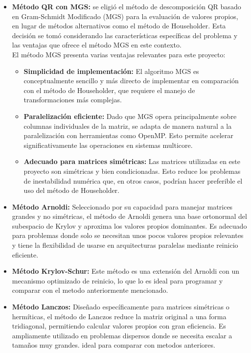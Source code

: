 \documentclass{article}
\begin{document}
\begin{itemize}
    \item \textbf{Método QR con MGS:}  
     se eligió el método de descomposición QR basado en Gram-Schmidt Modificado (MGS) para la evaluación de valores propios, en lugar de métodos alternativos como el método de Householder. Esta decisión se tomó considerando las características específicas del problema y las ventajas que ofrece el método MGS en este contexto.
\\
    
    El método MGS presenta varias ventajas relevantes para este proyecto:
    \begin{itemize}
        \item \textbf{Simplicidad de implementación:} El algoritmo MGS es conceptualmente sencillo y más directo de implementar en comparación con el método de Householder, que requiere el manejo de transformaciones más complejas.
        \item \textbf{Paralelización eficiente:} Dado que MGS opera principalmente sobre columnas individuales de la matriz, se adapta de manera natural a la paralelización con herramientas como OpenMP. Esto permite acelerar significativamente las operaciones en sistemas multicore.
        \item \textbf{Adecuado para matrices simétricas:} Las matrices utilizadas en este proyecto son simétricas y bien condicionadas. Esto reduce los problemas de inestabilidad numérica que, en otros casos, podrían hacer preferible el uso del método de Householder.
    \end{itemize}

    \item \textbf{Método Arnoldi:}  
    Seleccionado por su capacidad para manejar matrices grandes y no simétricas, el método de Arnoldi genera una base ortonormal del subespacio de Krylov y aproxima los valores propios dominantes. Es adecuado para problemas donde solo se necesitan unos pocos valores propios relevantes y tiene la flexibilidad de usarse en arquitecturas paralelas mediante reinicio eficiente.

    \item \textbf{Método Krylov-Schur:}  
    Este método es una extensión del Arnoldi con un mecanismo optimizado de reinicio, lo que lo es ideal para programar y comparar con el metodo anteriormente mencionado.

    \item \textbf{Método Lanczos:}  
    Diseñado específicamente para matrices simétricas o hermíticas, el método de Lanczos reduce la matriz original a una forma tridiagonal, permitiendo calcular valores propios con gran eficiencia. Es ampliamente utilizado en problemas dispersos donde se necesita escalar a tamaños muy grandes. ideal para comparar con metodos anteriores.
\end{itemize}
\end{document}
